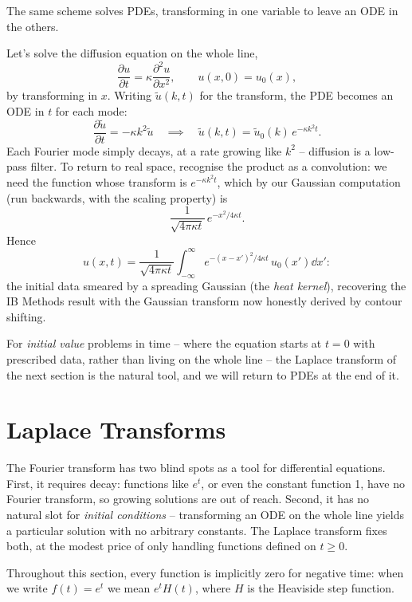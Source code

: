 The same scheme solves PDEs, transforming in one variable to leave an ODE in the others.

\begin{example}
	Let's solve the diffusion equation on the whole line,
	$$
	\frac{\partial u}{\partial t} = \kappa \frac{\partial^2 u}{\partial x^2}, \qquad u(x, 0) = u_0(x),
	$$
	by transforming in $x$. Writing $\tilde u(k, t)$ for the transform, the PDE becomes an ODE in $t$ for each mode:
	$$
	\frac{\partial \tilde u}{\partial t} = -\kappa k^2 \tilde u
	\quad\implies\quad
	\tilde u(k, t) = \tilde u_0(k)\, e^{-\kappa k^2 t}.
	$$
	Each Fourier mode simply decays, at a rate growing like $k^2$ -- diffusion is a low-pass filter. To return to real space, recognise the product as a convolution: we need the function whose transform is $e^{-\kappa k^2 t}$, which by our Gaussian computation (run backwards, with the scaling property) is
	$$
	\frac{1}{\sqrt{4\pi \kappa t}} \, e^{-x^2/4\kappa t}.
	$$
	Hence
	$$
	u(x, t) = \frac{1}{\sqrt{4\pi \kappa t}}\int_{-\infty}^\infty e^{-(x - x')^2/4\kappa t} \, u_0(x') \dd x' :
	$$
	the initial data smeared by a spreading Gaussian (the \emph{heat kernel}), recovering the IB Methods result with the Gaussian transform now honestly derived by contour shifting.
\end{example}

For \emph{initial value} problems in time -- where the equation starts at $t = 0$ with prescribed data, rather than living on the whole line -- the Laplace transform of the next section is the natural tool, and we will return to PDEs at the end of it.

\section{Laplace Transforms}

The Fourier transform has two blind spots as a tool for differential equations. First, it requires decay: functions like $e^t$, or even the constant function 1, have no Fourier transform, so growing solutions are out of reach. Second, it has no natural slot for \emph{initial conditions} -- transforming an ODE on the whole line yields a particular solution with no arbitrary constants. The Laplace transform fixes both, at the modest price of only handling functions defined on $t \geq 0$.

Throughout this section, every function is implicitly zero for negative time: when we write $f(t) = e^t$ we mean $e^t H(t)$, where $H$ is the Heaviside step function.

